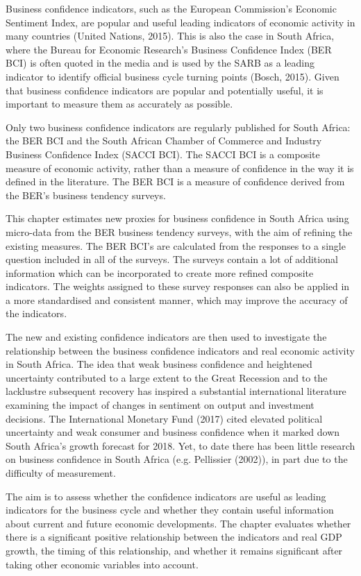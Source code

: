 \documentclass[11pt,]{article}
\begin{document}
Business confidence indicators, such as the European Commission's
Economic Sentiment Index, are popular and useful leading indicators of
economic activity in many countries (United Nations, 2015). This is also
the case in South Africa, where the Bureau for Economic Research's
Business Confidence Index (BER BCI) is often quoted in the media and is
used by the SARB as a leading indicator to identify official business
cycle turning points (Bosch, 2015). Given that business confidence
indicators are popular and potentially useful, it is important to
measure them as accurately as possible.

Only two business confidence indicators are regularly published for
South Africa: the BER BCI and the South African Chamber of Commerce and
Industry Business Confidence Index (SACCI BCI). The SACCI BCI is a
composite measure of economic activity, rather than a measure of
confidence in the way it is defined in the literature. The BER BCI is a
measure of confidence derived from the BER's business tendency surveys.

This chapter estimates new proxies for business confidence in South
Africa using micro-data from the BER business tendency surveys, with the
aim of refining the existing measures. The BER BCI's are calculated from
the responses to a single question included in all of the surveys. The
surveys contain a lot of additional information which can be
incorporated to create more refined composite indicators. The weights
assigned to these survey responses can also be applied in a more
standardised and consistent manner, which may improve the accuracy of
the indicators.

The new and existing confidence indicators are then used to investigate
the relationship between the business confidence indicators and real
economic activity in South Africa. The idea that weak business
confidence and heightened uncertainty contributed to a large extent to
the Great Recession and to the lacklustre subsequent recovery has
inspired a substantial international literature examining the impact of
changes in sentiment on output and investment decisions. The
International Monetary Fund (2017) cited elevated political uncertainty
and weak consumer and business confidence when it marked down South
Africa's growth forecast for 2018. Yet, to date there has been little
research on business confidence in South Africa (e.g. Pellissier
(2002)), in part due to the difficulty of measurement.

The aim is to assess whether the confidence indicators are useful as
leading indicators for the business cycle and whether they contain
useful information about current and future economic developments. The
chapter evaluates whether there is a significant positive relationship
between the indicators and real GDP growth, the timing of this
relationship, and whether it remains significant after taking other
economic variables into account.
\end{document}
